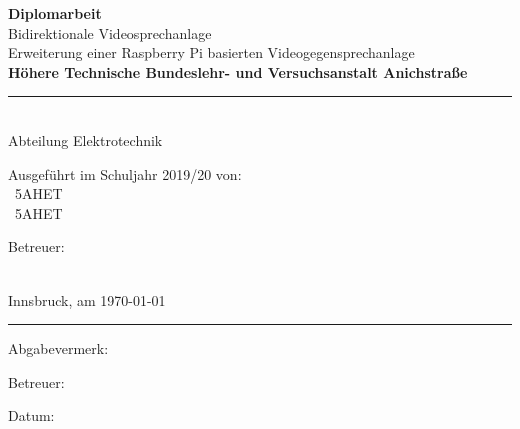 \begin{center}
	\vspace*{2cm}
	\Huge\textbf{Diplomarbeit}\\
	\vspace*{2cm}
	\huge Bidirektionale Videosprechanlage\\
	\vspace*{0.5cm}
	\normalsize Erweiterung einer Raspberry Pi basierten Videogegensprechanlage\\
	\vspace*{1.5cm}
	\textbf{Höhere Technische Bundeslehr- und Versuchsanstalt Anichstraße}\\
	\vspace*{0.5cm}
	\rule{0.75\linewidth}{0.4pt}\\
	\vspace*{0.5cm}
	Abteilung Elektrotechnik\\
	\vspace*{1cm}
	\begin{minipage}[t]{0.425\linewidth}
		\begin{flushleft}
			Ausgeführt im Schuljahr 2019/20 von:\bigskip\\
			\AndreasGrain\ 5AHET\\
			\MatthiasMair\ 5AHET\\
		\end{flushleft}
	\end{minipage}
	\begin{minipage}[t]{0.425\linewidth}
		\begin{flushright}
			Betreuer:\bigskip\\
			\MarioPrantl\\
		\end{flushright}
	\end{minipage}
\end{center}
\vspace*{1cm}
\vfill
Innsbruck, am \today
\vspace*{1cm}
\hrule
\vspace*{1cm}
\noindent\begin{minipage}{0.495\linewidth}
	Abgabevermerk:	
\end{minipage}
\begin{minipage}{0.495\linewidth}
	Betreuer:	
\end{minipage}
\begin{flushleft}
	Datum:
\end{flushleft}
\restoregeometry